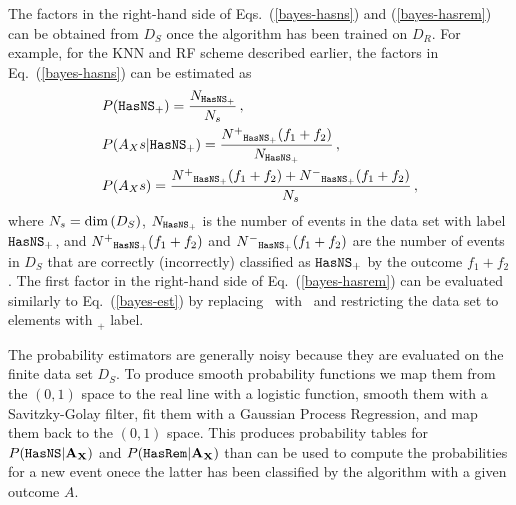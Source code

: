 The factors in the right-hand side of Eqs.~(\ref{bayes-hasns}) and (\ref{bayes-hasrem}) can be obtained from $D_{S}$ once the algorithm has been trained on $D_{R}$. For example, for the \ac{KNN} and \ac{RF} scheme described earlier, the factors in Eq.~(\ref{bayes-hasns}) can be estimated as  
%
\begin{align}
&P({{\tt HasNS}}_+)=\frac{N_{{{\tt HasNS}}_+}}{N_s}\,,\nonumber\\
&P(A_Xs|{{\tt HasNS}}_+)=\frac{N^+{}_{{{\tt HasNS}}_+}(f_1+f_2)}{N_{{{\tt HasNS}}_+}}\,,\nonumber\\
&P(A_Xs)=\frac{N^+{}_{{{\tt HasNS}}_+}(f_1+f_2)+N^-{}_{{{\tt HasNS}}_+}(f_1+f_2)}{N_s}\,,\label{bayes-est}
\end{align}
%
where $N_s=\hbox{dim}\,(D_S)$, $N_{{{\tt HasNS}}_+}$ is the number of events in the data set with label ${{\tt HasNS}}_+$, and $N^+{}_{{{\tt HasNS}}_+}(f_1+f_2)$ and $N^-{}_{{{\tt HasNS}}_+}(f_1+f_2)$ are the number of events in $D_S$ that are correctly (incorrectly) classified as ${{{\tt HasNS}}_+}$ by the outcome $f_1+f_2$. The first factor in the right-hand side of Eq.~(\ref{bayes-hasrem}) can be evaluated similarly to Eq.~(\ref{bayes-est}) by replacing \hasns\ with \hasrem\ and restricting the data set to elements with \hasns$_+$ label.

The probability estimators are generally noisy because they are evaluated on the finite data set $D_S$. To produce smooth probability functions we map them from the $(0,1)$ space to the real line with a logistic function, smooth them with a Savitzky-Golay filter, fit them with a Gaussian Process Regression, and map them back to the $(0,1)$ space. This produces probability tables for 
$P({{\tt HasNS}}|{\bf A}_{\bf X})$ and $P({{\tt HasRem}}|{\bf A}_{\bf X})$ than can be used to compute the probabilities for a new event onece the latter has been classified by the algorithm with a given outcome $A$.  

~\\\\
